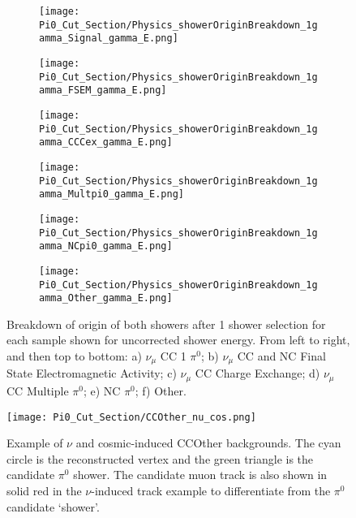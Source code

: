\clearpage
\begin{figure}[H]
\centering
  \begin{subfigure}[H]{0.25\textwidth}
    \centering
\texttt{[image: Pi0\_Cut\_Section/Physics\_showerOriginBreakdown\_1gamma\_Signal\_gamma\_E.png]}
  \caption{ }
  \end{subfigure} 
  \hspace{4mm}
  \begin{subfigure}[H]{0.25\textwidth}
    \centering
\texttt{[image: Pi0\_Cut\_Section/Physics\_showerOriginBreakdown\_1gamma\_FSEM\_gamma\_E.png]}
  \caption{ }
  \end{subfigure} 
  \hspace{4mm}
  \begin{subfigure}[H]{0.25\textwidth}
    \centering
\texttt{[image: Pi0\_Cut\_Section/Physics\_showerOriginBreakdown\_1gamma\_CCCex\_gamma\_E.png]}
  \caption{ }
  \end{subfigure} 
  \hspace{4mm}
  \begin{subfigure}[H]{0.25\textwidth}
    \centering
\texttt{[image: Pi0\_Cut\_Section/Physics\_showerOriginBreakdown\_1gamma\_Multpi0\_gamma\_E.png]}
  \caption{ }
  \end{subfigure} 
  \hspace{4mm}
  \begin{subfigure}[H]{0.25\textwidth}
    \centering
\texttt{[image: Pi0\_Cut\_Section/Physics\_showerOriginBreakdown\_1gamma\_NCpi0\_gamma\_E.png]}
  \caption{ }
  \end{subfigure} 
  \hspace{4mm}
  \begin{subfigure}[H]{0.25\textwidth}
    \centering
\texttt{[image: Pi0\_Cut\_Section/Physics\_showerOriginBreakdown\_1gamma\_Other\_gamma\_E.png]}
  \caption{ }
  \end{subfigure} 
\caption{ Breakdown of origin of both showers after 1 shower selection for each sample shown for uncorrected shower energy.  From left to right, and then top to bottom: a) $\nu_{\mu}$ CC 1 $\pi^0$; b) $\nu_\mu$ CC and NC Final State Electromagnetic Activity; c) $\nu_{\mu}$ CC Charge Exchange; d) $\nu_\mu$ CC Multiple $\pi^0$; e) NC $\pi^0$; f) Other.  }
\label{fig:physics_showerOriginBreakdown_E}
\end{figure}

\begin{figure}[H]
\centering
\texttt{[image: Pi0\_Cut\_Section/CCOther\_nu\_cos.png]}
\hspace{1 mm}
\caption{ Example of $\nu$ and cosmic-induced CCOther backgrounds. The cyan circle is the reconstructed vertex and the green triangle is the candidate $\pi^0$ shower.  The candidate muon track is also shown in solid red in the $\nu$-induced track example to differentiate from the $\pi^0$ candidate `shower'.  }
\label{fig:ccoth_bkgd_nu_cos}
\end{figure}

